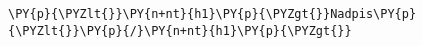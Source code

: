\begin{Verbatim}[commandchars=\\\{\}]
\PY{p}{\PYZlt{}}\PY{n+nt}{h1}\PY{p}{\PYZgt{}}Nadpis\PY{p}{\PYZlt{}}\PY{p}{/}\PY{n+nt}{h1}\PY{p}{\PYZgt{}}
\end{Verbatim}
